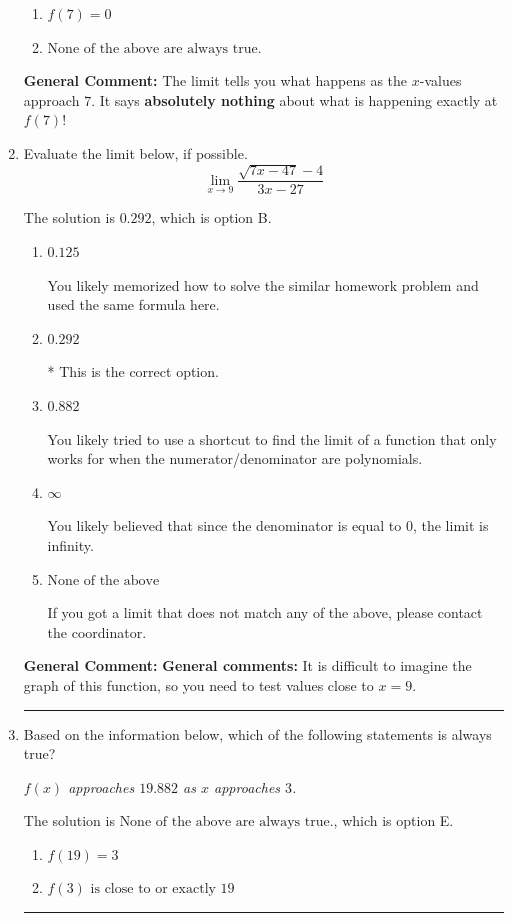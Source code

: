 \documentclass{extbook}[14pt]
\newcommand{\litem}[1]{\item #1

\rule{\textwidth}{0.4pt}}
\begin{document}
\begin{enumerate}
{\begin{enumerate}[label=\Alph*.]
\item \( f(7) = 0 \)


\item \( \text{None of the above are always true.} \)


\end{enumerate}

\textbf{General Comment:} The limit tells you what happens as the $x$-values approach $7$. It says \textbf{absolutely nothing} about what is happening exactly at $f(7)$!
}
\litem{
Evaluate the limit below, if possible.
\[ \lim_{x \rightarrow 9} \frac{\sqrt{7x - 47} - 4}{3x - 27} \]

The solution is \( 0.292 \), which is option B.\begin{enumerate}[label=\Alph*.]
\item \( 0.125 \)

You likely memorized how to solve the similar homework problem and used the same formula here.
\item \( 0.292 \)

* This is the correct option.
\item \( 0.882 \)

You likely tried to use a shortcut to find the limit of a function that only works for when the numerator/denominator are polynomials.
\item \( \infty \)

You likely believed that since the denominator is equal to 0, the limit is infinity.
\item \( \text{None of the above} \)

If you got a limit that does not match any of the above, please contact the coordinator.
\end{enumerate}

\textbf{General Comment:} \textbf{General comments:} It is difficult to imagine the graph of this function, so you need to test values close to $x = 9$.
}
\litem{
Based on the information below, which of the following statements is always true?

\begin{center}
    \textit{ $f(x)$ approaches $19.882$ as $x$ approaches $3$. }
\end{center}


The solution is \( \text{None of the above are always true.} \), which is option E.\begin{enumerate}[label=\Alph*.]
\item \( f(19) = 3 \)


\item \( f(3) \text{ is close to or exactly } 19 \)



\end{enumerate}}
\end{enumerate}
\end{document}
